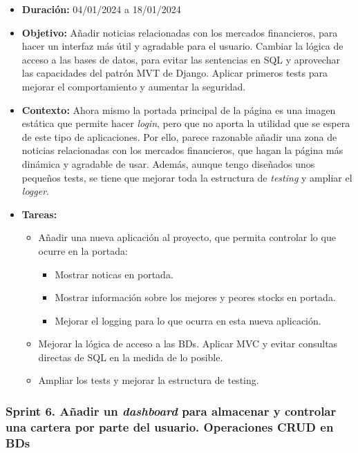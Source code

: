 \begin{itemize}
\item  
\textbf{Duración:} 04/01/2024 a 18/01/2024

\item
\textbf{Objetivo:} Añadir noticias relacionadas con los mercados financieros, para hacer un interfaz más útil y agradable para el usuario. Cambiar la lógica de acceso a las bases de datos, para evitar las sentencias en SQL y aprovechar las capacidades del patrón MVT\citep{online:django_MVT_2} de Django. Aplicar primeros tests para mejorar el comportamiento y aumentar la seguridad. 

\item
\textbf{Contexto:} Ahora mismo la portada principal de la página es una imagen estática que permite hacer \emph{login}, pero que no aporta la utilidad que se espera de este tipo de aplicaciones. Por ello, parece razonable añadir una zona de noticias relacionadas con los mercados financieros, que hagan la página más dinámica y agradable de usar. Además, aunque tengo diseñados unos pequeños tests, se tiene que mejorar toda la estructura de \emph{testing} y ampliar el \emph{logger}. 

\item
\textbf{Tareas:}
	\begin{itemize}
	\tightlist
	\item 
	Añadir una nueva aplicación al proyecto, que permita controlar lo que ocurre en la portada:
		\begin{itemize}
		\tightlist
		\item
		Mostrar noticas en portada.
		\item
		Mostrar información sobre los mejores y peores stocks en portada.
		\item
		Mejorar el logging para lo que ocurra en esta nueva aplicación.
		\end{itemize}
	\item
	Mejorar la lógica de acceso a las BDs. Aplicar MVC y evitar consultas directas de SQL en la medida de lo posible.
	\item 	
	Ampliar los tests y mejorar la estructura de testing. 
  	\end{itemize}
\end{itemize}


\subsubsection{Sprint 6. Añadir un \emph{dashboard} para almacenar y controlar una cartera por parte del usuario. Operaciones CRUD en BDs}

